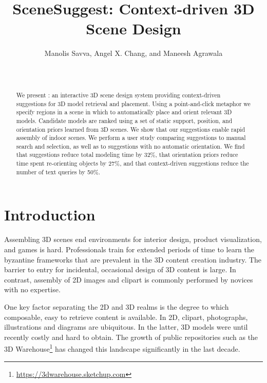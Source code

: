 \documentclass{sigchi}
\begin{document}
\title{SceneSuggest: Context-driven 3D Scene Design}
\author{
  \alignauthor Manolis Savva, Angel X. Chang, \textnormal{\large and} Maneesh Agrawala\\
  \\
  \\
}
\toappear{}
\maketitle
\begin{abstract}
We present \SceneSuggest: an interactive 3D scene design system providing context-driven suggestions for 3D model retrieval and placement.  Using a point-and-click metaphor we specify regions in a scene in which to automatically place and orient relevant 3D models.  Candidate models are ranked using a set of static support, position, and orientation priors learned from 3D scenes.  We show that our suggestions enable rapid assembly of indoor scenes.  We perform a user study comparing suggestions to manual search and selection, as well as to suggestions with no automatic orientation.  We find that suggestions reduce total modeling time by 32\%, that orientation priors reduce time spent re-orienting objects by 27\%, and that context-driven suggestions reduce the number of text queries by 50\%.
\end{abstract}

\section{Introduction}

Assembling 3D scenes end environments for interior design, product visualization, and games is hard.  Professionals train for extended periods of time to learn the byzantine frameworks that are prevalent in the 3D content creation industry.  The barrier to entry for incidental, occasional design of 3D content is large.  In contrast, assembly of 2D images and clipart is commonly performed by novices with no expertise.

One key factor separating the 2D and 3D realms is the degree to which composable, easy to retrieve content is available.  In 2D, clipart, photographs, illustrations and diagrams are ubiquitous.  In the latter, 3D models were until recently costly and hard to obtain.  The growth of public repositories such as the 3D Warehouse\footnote{\url{https://3dwarehouse.sketchup.com}} has changed this landscape significantly in the last decade.
\end{document}
